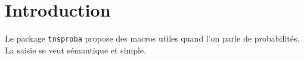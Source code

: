 \documentclass[12pt,a4paper]{article}
\begin{document}
\section{Introduction}

Le package \verb+tnsproba+ propose des macros utiles quand l'on parle de probabilités. La saisie se veut sémantique et simple.
\end{document}

